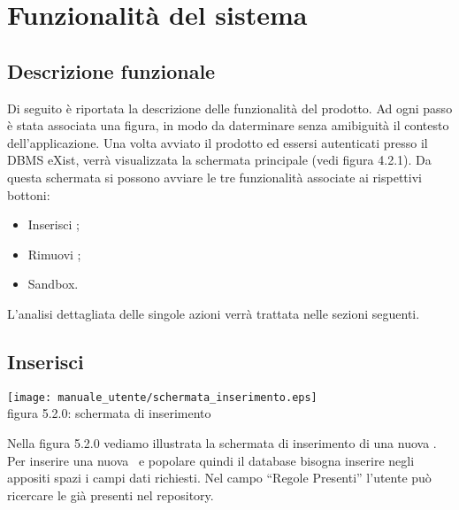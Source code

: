 \chapter{Funzionalit\`a del sistema}
\section{Descrizione funzionale}
Di seguito \`e riportata la descrizione delle funzionalit\`a del prodotto. Ad ogni passo \`e stata associata una figura, in modo da daterminare senza amibiguit\`a il contesto dell'applicazione. Una volta avviato il prodotto ed essersi autenticati presso il DBMS eXist, verr\`a visualizzata la schermata principale (vedi figura 4.2.1).
Da questa schermata si possono avviare le tre funzionalit\`a associate ai rispettivi bottoni:
\begin{itemize}
\item Inserisci \br;
\item Rimuovi \br;
\item Sandbox.
\end{itemize}
L'analisi dettagliata delle singole azioni verr\`a trattata nelle sezioni seguenti.
\section{Inserisci \br}
\begin{center}
\texttt{[image: manuale\_utente/schermata\_inserimento.eps]}\\
 figura 5.2.0: schermata di inserimento
\end{center}
Nella figura 5.2.0 vediamo illustrata la schermata di inserimento di una nuova \br. Per inserire una nuova \br\ e popolare quindi il database bisogna inserire negli appositi spazi i campi dati richiesti.
Nel campo ``Regole Presenti'' l'utente pu\`o ricercare le \br gi\`a presenti nel repository.
